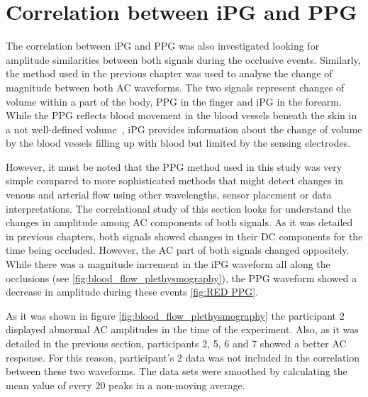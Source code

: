 \section{Correlation between iPG and PPG}  %
\label{section correlation 3}
The correlation between iPG and PPG was also investigated looking for amplitude similarities between both signals during the occlusive events. Similarly, the method used in the previous chapter was used to analyse the change of magnitude between both AC waveforms. The two signals represent changes of volume within a part of the body, PPG in the finger and iPG in the forearm. While the PPG reflects blood movement in the blood vessels beneath the skin in a not well-defined volume~\cite{elgendi2012analysis}, iPG provides information about the change of volume by the blood vessels filling up with blood but limited by the sensing electrodes.

However, it must be noted that the PPG method used in this study was very simple compared to more sophisticated methods that might detect changes in venous and arterial flow using other wavelengths, sensor placement or data interpretations. The correlational study of this section looks for understand the changes in amplitude among AC components of both signals. As it was detailed in previous chapters, both signals showed changes in their DC components for the time being occluded. However, the AC part of both signals changed oppositely. While there was a magnitude increment in the iPG waveform all along the occlusions (see \ref{fig:blood_flow_plethysmography}), the PPG waveform showed a decrease in amplitude during these events \ref{fig:RED PPG}.

As it was shown in figure \ref{fig:blood_flow_plethysmography} the participant 2 displayed abnormal AC amplitudes in the time of the experiment. Also, as it was detailed in the previous section, participants 2, 5, 6 and 7 showed a better AC response. For this reason, participant's 2 data was not included in the correlation between these two waveforms. The data sets were smoothed by calculating the mean value of every 20 peaks in a non-moving average.

